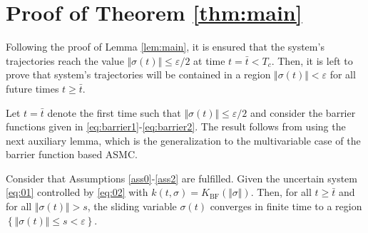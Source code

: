 \documentclass[twocolumn]{autart}    %
\begin{document}
\section{Proof of Theorem \ref{thm:main}}\label{app:proofBFtheorem} 
\vspace{-3mm}
Following the proof of Lemma \ref{lem:main}, it is ensured that the system's trajectories reach the value $\Vert \sigma(t) \Vert \leq \varepsilon/2$ at time $t=\bar{t}<T_c$. Then, it is left to prove that system’s trajectories will be contained in a region $\Vert \sigma(t) \Vert < \varepsilon$ for all future times $t\geq \bar{t}$.

Let $t=\bar{t}$ denote the first time such that $\Vert \sigma(t) \Vert \leq \varepsilon/2$ and consider the barrier functions given in \eqref{eq:barrier1}-\eqref{eq:barrier2}. The result follows from using the next auxiliary lemma, which is the generalization to the multivariable case of the barrier function based ASMC.
\vspace{-1mm}
\begin{lem}\label{lem:barrierfun}
Consider that Assumptions \ref{ass0}-\ref{ass2} are fulfilled. Given the uncertain system \eqref{eq:01} controlled by \eqref{eq:02} with $k(t,\sigma)=K_{\mathrm{BF}}(\Vert \sigma \Vert)$. Then, for all $t \geq \bar{t}$ and for all $\Vert \sigma(t) \Vert > s$,  the sliding variable $\sigma(t)$ converges in finite time to a region $\left\lbrace \Vert \sigma(t)\Vert \leq s < \varepsilon \right\rbrace$.
\end{lem}\vspace{-10pt}
\end{document}
